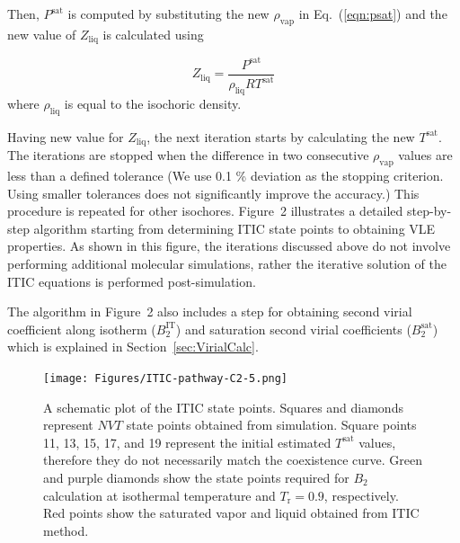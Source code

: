 \documentclass[5p,times]{elsarticle}
\begin{document}
Then, $P^\mathrm{sat}$ is computed by substituting the new $\rho_\mathrm{vap}$ in Eq.~(\ref{eqn:psat}) and the new value of $Z_\mathrm{liq}$ is calculated using

\begin{equation}
{Z_{\mathrm{liq}}} = \frac{P^\mathrm{sat}}{\rho_\mathrm{liq}RT^\mathrm{sat}}  
\label{eqn:zliq}
\end{equation}
where $\rho_\mathrm{liq}$ is equal to the isochoric density.

Having new value for $Z_{\mathrm{liq}}$, the next iteration starts by calculating the new $T^\mathrm{sat}$. The iterations are stopped when the difference in two consecutive $\rho_\mathrm{vap}$ values are less than a defined tolerance (We use 0.1 \% deviation as the stopping criterion. Using smaller tolerances does not significantly improve the accuracy.) This procedure is repeated for other isochores. Figure~2 illustrates a detailed step-by-step algorithm starting from determining ITIC state points to obtaining VLE properties. As shown in this figure, the iterations discussed above do not involve performing additional molecular simulations, rather the iterative solution of the ITIC equations is performed post-simulation. 

The algorithm in Figure~2 also includes a step for obtaining second virial coefficient along isotherm ($B_2^\mathrm{IT}$) and saturation second virial coefficients ($B_2^\mathrm{sat}$) which is explained in Section~\ref{sec:VirialCalc}.
\begin{figure}
\texttt{[image: Figures/ITIC-pathway-C2-5.png]}
\caption{A schematic plot of the ITIC state points. Squares and diamonds represent $NVT$ state points obtained from simulation. Square points 11, 13, 15, 17, and 19 represent the initial estimated $T^\mathrm{sat}$ values, therefore they do not necessarily match the coexistence curve. Green and purple diamonds show the state points required for $B_2$ calculation at isothermal temperature and $T_\mathrm{r}=0.9$, respectively. Red points show the saturated vapor and liquid obtained from ITIC method.}
\label{fig:ITICpathway}
\end{figure}
\end{document}
